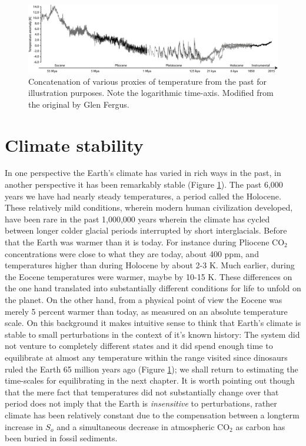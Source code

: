 \documentclass[12pt]{book}
\begin{document}
\begin{figure}
\begin{center}
\includegraphics[width=15 cm]{../external_figures/Paleo_temperature_timeseries}
\end{center}
\caption{ Concatenation of various proxies of temperature from the past for illustration purposes. Note the logarithmic time-axis. Modified from the original by Glen Fergus. } 
\label{fig:Paleo_temperature_timeseries}
\end{figure}


\section{Climate stability}
In one perspective the Earth's climate has varied in rich ways in the past, in another perspective it has been remarkably stable (Figure \ref{fig:Paleo_temperature_timeseries}). The past 6,000 years we have had nearly steady temperatures, a period called the Holocene. These relatively mild conditions, wherein modern human civilization developed, have been rare in the past 1,000,000 years wherein the climate has cycled between longer colder glacial periods interrupted by short interglacials. Before that the Earth was warmer than it is today. For instance during Pliocene CO$_2$ concentrations were close to what they are today, about 400 ppm, and temperatures higher than during Holocene by about 2-3 K. Much earlier, during the Eocene temperatures were warmer, maybe by 10-15 K. These differences on the one hand translated into substantially different conditions for life to unfold on the planet. On the other hand, from a physical point of view the Eocene was merely 5 percent warmer than today, as measured on an absolute temperature scale. 
On this background it makes intuitive sense to think that Earth's climate is stable to small perturbations in the context of it's known history: The system did not venture to completely different states and it did spend enough time to equilibrate at almost any temperature within the range visited since dinosaurs ruled the Earth 65 million years ago (Figure \ref{fig:Paleo_temperature_timeseries}); we shall return to estimating the time-scales for equilibrating in the next chapter. It is worth pointing out though that the mere fact that temperatures did not substantially change over that period does not imply that the Earth is {\em insensitive} to perturbations, rather climate has been relatively constant due to the compensation between a longterm increase in $S_o$ and a simultaneous decrease in atmospheric CO$_2$ as carbon has been buried in fossil sediments. 
\end{document}

